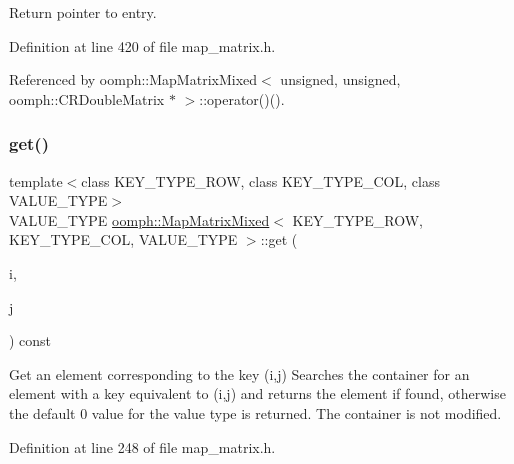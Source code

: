 Return pointer to entry. 



Definition at line 420 of file map\+\_\+matrix.\+h.



Referenced by oomph\+::\+Map\+Matrix\+Mixed$<$ unsigned, unsigned, oomph\+::\+C\+R\+Double\+Matrix $\ast$ $>$\+::operator()().

\mbox{\label{classoomph_1_1MapMatrixMixed_aee00d676e6d7833a9b2399bf919bb58a}} 
\subsubsection{\texorpdfstring{get()}{get()}}
{\footnotesize\ttfamily template$<$class K\+E\+Y\+\_\+\+T\+Y\+P\+E\+\_\+\+R\+OW, class K\+E\+Y\+\_\+\+T\+Y\+P\+E\+\_\+\+C\+OL, class V\+A\+L\+U\+E\+\_\+\+T\+Y\+PE$>$ \\
V\+A\+L\+U\+E\+\_\+\+T\+Y\+PE \hyperlink{classoomph_1_1MapMatrixMixed}{oomph\+::\+Map\+Matrix\+Mixed}$<$ K\+E\+Y\+\_\+\+T\+Y\+P\+E\+\_\+\+R\+OW, K\+E\+Y\+\_\+\+T\+Y\+P\+E\+\_\+\+C\+OL, V\+A\+L\+U\+E\+\_\+\+T\+Y\+PE $>$\+::get (\begin{DoxyParamCaption}\item[{const K\+E\+Y\+\_\+\+T\+Y\+P\+E\+\_\+\+R\+OW \&}]{i,  }\item[{const K\+E\+Y\+\_\+\+T\+Y\+P\+E\+\_\+\+C\+OL \&}]{j }\end{DoxyParamCaption}) const\hspace{0.3cm}{\ttfamily [inline]}}



Get an element corresponding to the key (i,j) Searches the container for an element with a key equivalent to (i,j) and returns the element if found, otherwise the default 0 value for the value type is returned. The container is not modified. 



Definition at line 248 of file map\+\_\+matrix.\+h.

\mbox{\label{classoomph_1_1MapMatrixMixed_a24bcb7415eaecc66e0649122ba748e5c}} 
